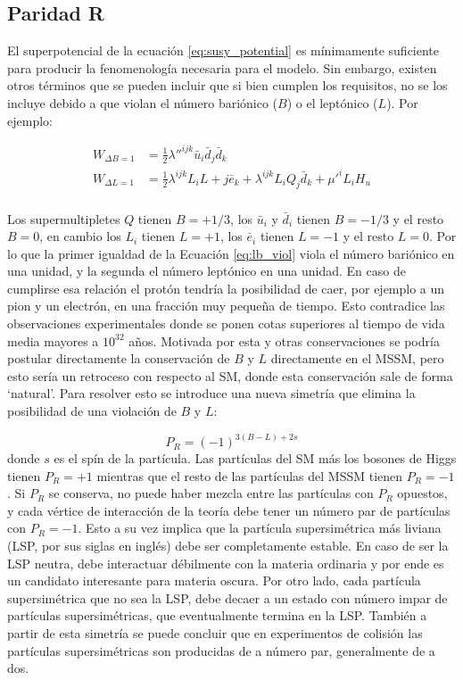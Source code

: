 \subsection{Paridad R}

El superpotencial de la ecuación \ref{eq:susy_potential} es mínimamente suficiente para producir la fenomenología necesaria para el modelo. Sin embargo, existen otros términos que se pueden incluir que si bien cumplen los requisitos, no se los incluye debido a que violan el número bariónico ($B$) o el leptónico ($L$). Por ejemplo:

\begin{equation}
	\begin{split}
		W_{\Delta B = 1} & = \frac{1}{2}\lambda ''^{ijk}\bar{u}_i\bar{d}_j\bar{d}_k \\
		W_{\Delta L = 1} & = \frac{1}{2}\lambda^{ijk}L_iL+j\bar{e}_k + \lambda^{ijk}L_iQ_j\bar{d}_k + \mu '^{i}L_i H_u \\
	\end{split}
	\label{eq:lb_viol}
\end{equation}

Los supermultipletes $Q$ tienen $B=+1/3$, los $\bar{u}_i$ y $\bar{d}_i$ tienen $B=-1/3$ y el resto $B=0$, en cambio los $L_i$ tienen $L=+1$, los $\bar{e}_i$ tienen $L=-1$ y el resto $L=0$. Por lo que la primer igualdad de la Ecuación \ref{eq:lb_viol} viola el número bariónico en una unidad, y la segunda el número leptónico en una unidad. En caso de cumplirse esa relación el protón tendría la posibilidad de caer, por ejemplo a un pion y un electrón, en una fracción muy pequeña de tiempo. Esto contradice las observaciones experimentales donde se ponen cotas superiores al tiempo de vida media mayores a $10^{32}$ años. Motivada por esta y otras conservaciones se podría postular directamente la conservación de $B$ y $L$ directamente en el MSSM, pero esto sería un retroceso con respecto al SM, donde esta conservación sale de forma `natural'. Para resolver esto se introduce una nueva simetría que elimina la posibilidad de una violación de $B$ y $L$:

\begin{equation}
	P_R = (-1)^{3(B-L)+2s}
\end{equation}
%
donde $s$ es el spín de la partícula. Las partículas del SM más los bosones de Higgs tienen $P_R = +1$ mientras que el resto de las partículas del MSSM tienen $P_R = -1$. Si $P_R$ se conserva, no puede haber mezcla entre las partículas con $P_R$ opuestos, y cada vértice de interacción de la teoría debe tener un número par de partículas con $P_R=-1$. Esto a su vez implica que la partícula supersimétrica más liviana (LSP, por sus siglas en inglés) debe ser completamente estable. En caso de ser la LSP neutra, debe interactuar débilmente con la materia ordinaria y por ende es un candidato interesante para materia oscura. Por otro lado, cada partícula supersimétrica que no sea la LSP, debe decaer a un estado con número impar de partículas supersimétricas, que eventualmente termina en la LSP. También a partir de esta simetría se puede concluir que en experimentos de colisión las partículas supersimétricas son producidas de a número par, generalmente de a dos.



